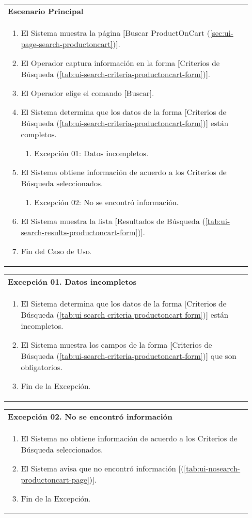	\begin{tabular}{ p{15.5cm} }
		\textbf{Escenario Principal} \\
		\begin{enumerate}
			\item El Sistema muestra la p\'agina [Buscar ProductOnCart (\ref{sec:ui-page-search-productoncart})].
			\item El Operador captura informaci\'on en la forma [Criterios de B\'usqueda (\ref{tab:ui-search-criteria-productoncart-form})].
			\item El Operador elige el comando [Buscar].
			\item El Sistema determina que los datos de la forma [Criterios de B\'usqueda (\ref{tab:ui-search-criteria-productoncart-form})] est\'an completos.
				\begin{enumerate}
					\item Excepci\'on 01: Datos incompletos.
				\end{enumerate}
			\item El Sistema obtiene informaci\'on de acuerdo a los Criterios de B\'usqueda seleccionados.
				\begin{enumerate}
					\item Excepci\'on 02: No se encontr\'o informaci\'on.
				\end{enumerate}
			\item El Sistema muestra la lista [Resultados de B\'usqueda (\ref{tab:ui-search-results-productoncart-form})].
			\item Fin del Caso de Uso.
		\end{enumerate}
	\end{tabular}
	
	\begin{tabular}{ p{15.5cm} }
		\textbf{Excepci\'on 01. Datos incompletos} \\
		\begin{enumerate}
			\item El Sistema determina que los datos de la forma [Criterios de B\'usqueda (\ref{tab:ui-search-criteria-productoncart-form})] est\'an incompletos.
			\item El Sistema muestra los campos de la forma [Criterios de B\'usqueda (\ref{tab:ui-search-criteria-productoncart-form})] que son obligatorios.
			\item Fin de la Excepci\'on.
		\end{enumerate}
	\end{tabular}
	
	\begin{tabular}{ p{15.5cm} }
		\textbf{Excepci\'on 02. No se encontr\'o informaci\'on} \\
		\begin{enumerate}
			\item El Sistema no obtiene informaci\'on de acuerdo a los Criterios de B\'usqueda seleccionados.
			\item El Sistema avisa que no encontr\'o informaci\'on [(\ref{tab:ui-nosearch-productoncart-page})].
			\item Fin de la Excepci\'on.
		\end{enumerate}
	\end{tabular}
	
